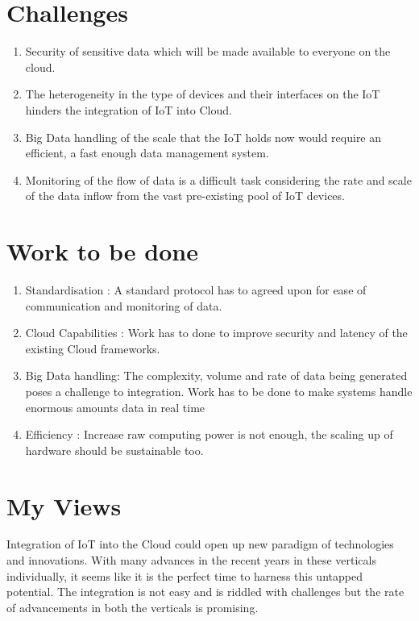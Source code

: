 \documentclass{article}
\begin{document}
\section*{Challenges}
\begin{enumerate}
  \item Security of sensitive data which will be made available to everyone on the cloud.
  \item The heterogeneity in the type of devices and their interfaces on the IoT hinders the integration of IoT into Cloud. 
  \item Big Data handling of the scale that the IoT holds now would require an efficient, a fast enough data management system.
  \item Monitoring of the flow of data is a difficult task considering the rate and scale of the data inflow from the vast pre-existing pool of IoT devices.
\end{enumerate}

\section*{Work to be done }
\begin{enumerate}
  \item Standardisation : A standard protocol has to agreed upon for ease of communication and monitoring of data.
  \item Cloud Capabilities : Work has to done to improve security and latency of the existing Cloud frameworks. 
  \item Big Data handling: The complexity, volume and rate of data being generated poses a challenge to integration. Work has to be done to make systems handle enormous amounts data in real time
  \item Efficiency : Increase raw computing power is not enough, the scaling up of hardware should be sustainable too.
\end{enumerate}

\section*{My Views}
Integration of IoT into the Cloud could open up new paradigm of technologies and innovations. With many advances in the recent years in these verticals individually, it seems like it is the perfect time to harness this untapped potential. The integration is not easy and is riddled with challenges but the rate of advancements in both the verticals is promising. 
\end{document}
